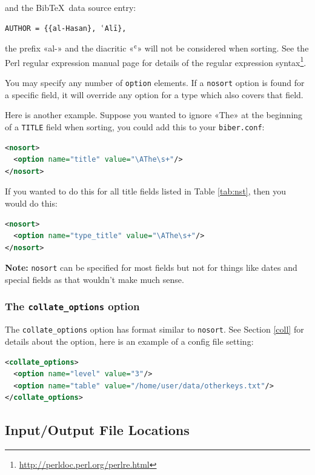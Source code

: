 \documentclass{ltxdockit}
\begin{document}
\noindent and the Bib\TeX\ data source entry:

\begin{verbatim}
AUTHOR = {{al-Hasan}, ʿAlī},
\end{verbatim}

\noindent the prefix «al-» and the diacritic «ʿ» will not be considered
when sorting. See the Perl regular expression manual page for
details of the regular expression syntax\footnote{\url{http://perldoc.perl.org/perlre.html}}.

You may specify any number of \verb+option+ elements. If a
\verb+nosort+ option is found for a specific field, it will override
any option for a type which also covers that field.

Here is another example. Suppose you wanted to ignore «The» at the
beginning of a \verb+TITLE+ field when sorting, you could add this to your
\verb+biber.conf+:

\begin{lstlisting}[language=xml]
<nosort>
  <option name="title" value="\AThe\s+"/>
</nosort>
\end{lstlisting}

\noindent If you wanted to do this for all title fields listed in Table
\ref{tab:nst}, then you would do this:

\begin{lstlisting}[language=xml]
<nosort>
  <option name="type_title" value="\AThe\s+"/>
</nosort>
\end{lstlisting}

\noindent \textbf{Note:} \verb+nosort+ can be specified for most fields but
not for things like dates and special fields as that wouldn't make much sense.
\bigskip
\subsubsection{The \texttt{collate\_options} option}

The \verb+collate_options+ option has format similar to
\verb+nosort+. See Section \ref{coll} for details about the option,
here is an example of a config file setting:

\begin{lstlisting}[language=xml]
<collate_options>
  <option name="level" value="3"/>
  <option name="table" value="/home/user/data/otherkeys.txt"/>
</collate_options>
\end{lstlisting}
\bigskip
\subsection{Input/Output File Locations}
\end{document}
